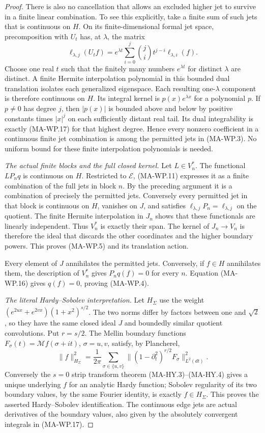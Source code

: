 \begin{proof}
There is also no cancellation that allows an excluded
higher jet to survive in a finite linear combination.
To see this explicitly, take a finite sum of such jets
that is continuous on $H$. On its finite-dimensional
formal jet space, precomposition with $U_t$ has, at
$\lambda$, the matrix
\[
 \ell_{\lambda,j}(U_tf)
       =e^{\lambda t}\sum_{i=0}^{j}
                       \binom{j}{i}t^{j-i}\ell_{\lambda,i}(f).
 \tag{MA-WP.18}
\]
Choose one real $t$ such that the finitely many numbers
$e^{\lambda t}$ for distinct $\lambda$ are distinct.
A finite Hermite interpolation polynomial in this bounded
dual translation isolates each generalized eigenspace.
Each resulting one-$\lambda$ component is therefore
continuous on $H$. Its integral kernel is
$p(x)e^{\lambda x}$ for a polynomial $p$.
If $p\ne0$ has degree $j$, then $|p(x)|$ is bounded above
and below by positive constants times $|x|^j$ on each
sufficiently distant real tail. Its dual integrability
is exactly (MA-WP.17) for that highest degree.
Hence every nonzero coefficient in a continuous finite
jet combination is among the permitted jets in
(MA-WP.3). No uniform bound for these finite interpolation
polynomials is needed.

\emph{The actual finite blocks and the full closed kernel.}
Let $L\in V_n^*$. The functional $L P_nq$ is continuous on
$H$. Restricted to $\mathcal E$, (MA-WP.11) expresses it
as a finite combination of the full jets in block $n$.
By the preceding argument it is a combination of precisely
the permitted jets. Conversely every permitted jet in that
block is continuous on $H$, vanishes on $J$, and satisfies
$\ell_{\lambda,j}P_n=\ell_{\lambda,j}$ on the quotient.
The finite Hermite interpolation in $J_n$ shows that these
functionals are linearly independent. Thus $V_n^*$ is
exactly their span. The kernel of $J_n\to V_n$ is
therefore the ideal that discards the other coordinates
and the higher boundary powers. This proves (MA-WP.5)
and its translation action.

Every element of $J$ annihilates the permitted jets.
Conversely, if $f\in H$ annihilates them, the description
of $V_n^*$ gives $P_nq(f)=0$ for every $n$.
Equation (MA-WP.16) gives $q(f)=0$, proving (MA-WP.4).

\emph{The literal Hardy--Sobolev interpretation.}
Let $H_\Sigma$ use the weight
$(e^{2ux}+e^{2vx})(1+x^2)^{s/2}$.
The two norms differ by factors between one and $\sqrt2$,
so they have the same closed ideal $J$ and boundedly
similar quotient convolutions. Put $r=s/2$.
The Mellin boundary functions
$F_\sigma(t)=\mathcal Mf(\sigma+it)$, $\sigma=u,v$,
satisfy, by Plancherel,
\[
 \|f\|_{H_\Sigma}^2
  =\frac1{2\pi}\sum_{\sigma\in\{u,v\}}
       \|(1-\partial_t^2)^{r/2}F_\sigma\|_{L^2(dt)}^2.
 \tag{MA-WP.19}
\]
Conversely the $s=0$ strip transform theorem
(MA-HY.3)--(MA-HY.4) gives a
unique underlying $f$ for an analytic Hardy function;
Sobolev regularity of its two boundary values, by the
same Fourier identity, is exactly $f\in H_\Sigma$.
This proves the asserted Hardy--Sobolev identification.
The continuous edge jets are actual derivatives of the
boundary values, also given by the absolutely convergent
integrals in (MA-WP.17).


\end{proof}
